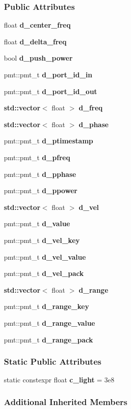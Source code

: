 \subsubsection*{Public Attributes}
\begin{DoxyCompactItemize}
\item 
float {\bf d\+\_\+center\+\_\+freq}
\item 
float {\bf d\+\_\+delta\+\_\+freq}
\item 
bool {\bf d\+\_\+push\+\_\+power}
\item 
pmt\+::pmt\+\_\+t {\bf d\+\_\+port\+\_\+id\+\_\+in}
\item 
pmt\+::pmt\+\_\+t {\bf d\+\_\+port\+\_\+id\+\_\+out}
\item 
{\bf std\+::vector}$<$ float $>$ {\bf d\+\_\+freq}
\item 
{\bf std\+::vector}$<$ float $>$ {\bf d\+\_\+phase}
\item 
pmt\+::pmt\+\_\+t {\bf d\+\_\+ptimestamp}
\item 
pmt\+::pmt\+\_\+t {\bf d\+\_\+pfreq}
\item 
pmt\+::pmt\+\_\+t {\bf d\+\_\+pphase}
\item 
pmt\+::pmt\+\_\+t {\bf d\+\_\+ppower}
\item 
{\bf std\+::vector}$<$ float $>$ {\bf d\+\_\+vel}
\item 
pmt\+::pmt\+\_\+t {\bf d\+\_\+value}
\item 
pmt\+::pmt\+\_\+t {\bf d\+\_\+vel\+\_\+key}
\item 
pmt\+::pmt\+\_\+t {\bf d\+\_\+vel\+\_\+value}
\item 
pmt\+::pmt\+\_\+t {\bf d\+\_\+vel\+\_\+pack}
\item 
{\bf std\+::vector}$<$ float $>$ {\bf d\+\_\+range}
\item 
pmt\+::pmt\+\_\+t {\bf d\+\_\+range\+\_\+key}
\item 
pmt\+::pmt\+\_\+t {\bf d\+\_\+range\+\_\+value}
\item 
pmt\+::pmt\+\_\+t {\bf d\+\_\+range\+\_\+pack}
\end{DoxyCompactItemize}
\subsubsection*{Static Public Attributes}
\begin{DoxyCompactItemize}
\item 
static constexpr float {\bf c\+\_\+light} = 3e8
\end{DoxyCompactItemize}
\subsubsection*{Additional Inherited Members}


